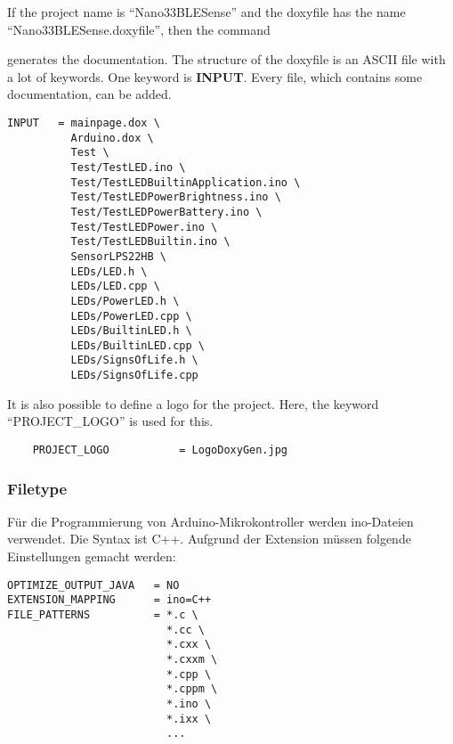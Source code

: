 If the project name is ``Nano33BLESense'' and the doxyfile has the name ``Nano33BLESense.doxyfile'', then the command 

\medskip


\medskip

generates the documentation. The structure of the doxyfile is an ASCII file with a lot of keywords. One keyword is \textbf{INPUT}. Every file, which contains some documentation, can be added. 


\begin{verbatim}
INPUT   = mainpage.dox \
          Arduino.dox \
          Test \
          Test/TestLED.ino \
          Test/TestLEDBuiltinApplication.ino \
          Test/TestLEDPowerBrightness.ino \
          Test/TestLEDPowerBattery.ino \
          Test/TestLEDPower.ino \
          Test/TestLEDBuiltin.ino \
          SensorLPS22HB \
          LEDs/LED.h \
          LEDs/LED.cpp \
          LEDs/PowerLED.h \
          LEDs/PowerLED.cpp \
          LEDs/BuiltinLED.h \
          LEDs/BuiltinLED.cpp \
          LEDs/SignsOfLife.h \
          LEDs/SignsOfLife.cpp 
\end{verbatim}

\bigskip

It is also possible to define a logo for the project. Here, the keyword ``PROJECT\_LOGO'' is used for this.

\begin{verbatim}
	PROJECT_LOGO           = LogoDoxyGen.jpg
\end{verbatim}



\subsubsection{Filetype }


Für die Programmierung von Arduino-Mikrokontroller werden ino-Dateien verwendet. Die Syntax ist C++. Aufgrund der Extension müssen folgende Einstellungen gemacht werden:




\begin{verbatim}
OPTIMIZE_OUTPUT_JAVA   = NO
EXTENSION_MAPPING      = ino=C++
FILE_PATTERNS          = *.c \
                         *.cc \
                         *.cxx \
                         *.cxxm \
                         *.cpp \
                         *.cppm \
                         *.ino \
                         *.ixx \
                         ...
\end{verbatim}	

